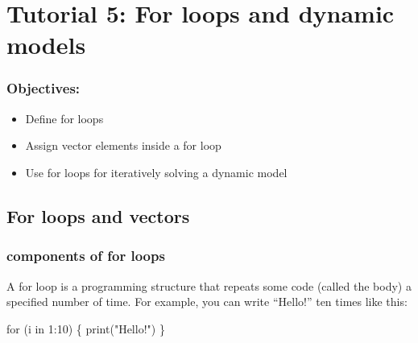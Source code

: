 \documentclass[
  letterpaper,
  DIV=11,
  numbers=noendperiod]{scrreprt}
\newenvironment{Shaded}{\begin{snugshade}}{\end{snugshade}}
\newcommand{\NormalTok}[1]{\textcolor[rgb]{0.00,0.23,0.31}{#1}}
\providecommand{\tightlist}{%
  \setlength{\itemsep}{0pt}\setlength{\parskip}{0pt}}\usepackage{longtable,booktabs,array}
\begin{document}

\hypertarget{tutorial-5-for-loops-and-dynamic-models}{%
\chapter*{Tutorial 5: For loops and dynamic
models}\label{tutorial-5-for-loops-and-dynamic-models}}


\hypertarget{objectives}{%
\subsection*{Objectives:}\label{objectives}}

\begin{itemize}
\tightlist
\item
  Define for loops
\item
  Assign vector elements inside a for loop
\item
  Use for loops for iteratively solving a dynamic model
\end{itemize}

\hypertarget{for-loops-and-vectors}{%
\section*{For loops and vectors}\label{for-loops-and-vectors}}


\hypertarget{components-of-for-loops}{%
\subsection*{components of for loops}\label{components-of-for-loops}}

A for loop is a programming structure that repeats some code (called the
body) a specified number of time. For example, you can write ``Hello!''
ten times like this:

\begin{Shaded}
\begin{Highlighting}[]
\NormalTok{for (i in 1:10) \{}
\NormalTok{  print("Hello!")}
\NormalTok{\}}
\end{Highlighting}
\end{Shaded}
\end{document}

